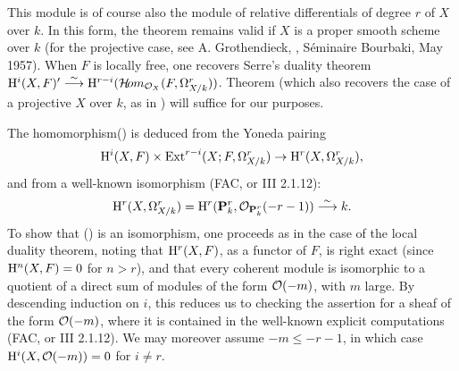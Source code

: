 \begin{remarquestar}
This module is of course also the module of relative differentials of degree $r$ of $X$ over $k$. In this form, the theorem remains valid if $X$ is a proper smooth scheme over $k$ (for the projective case, see A. Grothendieck, \og {}\fg, S\'eminaire Bourbaki, May 1957). When $F$ is locally free, one recovers Serre's duality theorem $\mathrm H^i(X, F)' \overset{\sim}{\longrightarrow} \mathrm H^{r-i}(\mathcal H\!om_{\mathcal O_X}(F, \Omega_{X/k}^r))$. Theorem  (which also recovers the case of a projective $X$ over $k$, as in {\loccit}) will suffice for our purposes.
\end{remarquestar} The homomorphism\pageoriginale () is deduced from the Yoneda pairing
\steco
\begin{equation} \label{eq:XII.3} {}\mathrm H^i(X, F) \times \operatorname{Ext}^{r-i}(X;F, \Omega_{X/k}^r) \to \mathrm H^r(X, \Omega_{X/k}^r),
\end{equation}
and from a well-known isomorphism (\cf FAC, or \EGA III 2.1.12):
\steco
\begin{equation} \label{eq:XII.4} {}\mathrm H^r(X, \Omega_{X/k}^r) = \mathrm H^r(\mathbf P_k^r, \mathcal O_{\mathbf P_k^r}(-r-1)) \overset{\sim}{\longrightarrow} k.
\end{equation}
To show that () is an isomorphism, one proceeds as in the case of the local duality theorem, noting that $\mathrm H^r(X, F)$, as a functor of $F$, is right exact (since $\mathrm H^n(X, F)=0$ for $n>r$), and that every coherent module is isomorphic to a quotient of a direct sum of modules of the form $\mathcal O(-m)$, with $m$ large. By descending induction on $i$, this reduces us to checking the assertion for a sheaf of the form $\mathcal O(-m)$, where it is contained in the well-known explicit computations (FAC, or \EGA III 2.1.12). We may moreover assume $-m \leq -r-1$, in which case $\mathrm H^i(X, \mathcal O(-m))=0$ for $i\neq r$.

